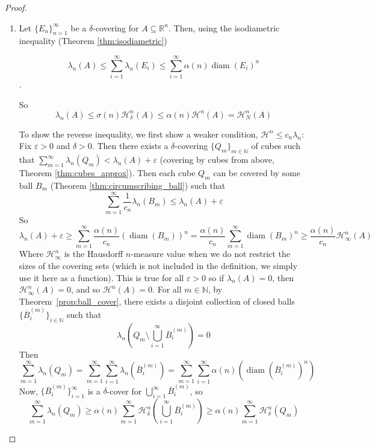 \documentclass{article}
\theoremstyle{plain}
\theoremstyle{definition}
\DeclareMathOperator{\diam}{diam}
\theoremstyle{remark}
\begin{document}
\begin{proof}
\begin{enumerate}
        \item Let $\{E_n\}_{n=1}^\infty$ be a $\delta$-covering for $A\subseteq \mathbb{R}^n$. Then, using the isodiametric inequality (Theorem \ref{thm:isodiametric})
        
            \[\lambda_n(A) \le \sum \limits _{i=1}^\infty \lambda_n(E_i) \le \sum \limits _{i=1}^\infty \alpha (n) \diam (E_i)^n\].
            
            So 
            \[\lambda_n(A) \le \sigma(n) \mathcal{H}^n_\delta (A) \le \alpha(n) \mathcal{H}^n(A) = \mathcal{H}_N^n(A)\] 
        
        To show the reverse inequality, we first show a weaker condition, $\mathcal{H}^n \le c_n \lambda_n$: Fix $\varepsilon>0$ and $\delta > 0$. Then there exists a $\delta$-covering $\{Q_m\}_{m\in \mathbb{N}}$ of cubes such that $\sum \limits _{m=1}^\infty \lambda_n(Q_m) < \lambda_n(A)+\varepsilon$ (covering by cubes from above, Theorem \ref{thm:cubes_approx}). Then each cube $Q_m$ can be covered by some ball $B_m$ (Theorem \ref{thm:circumscribing_ball}) such that 
        \[\sum \limits _{m=1}^\infty \frac{1}{c_n} \lambda_n(B_m) \le  \lambda_n(A)+\varepsilon\]
        So
        \[
        \lambda_n(A) + \varepsilon \ge \sum \limits _{m=1}^\infty \frac{\alpha (n)}{c_n} \left ({\diam (B_m)} \right )^n =\frac{\alpha (n)}{c_n} \sum \limits _{m=1}^\infty \diam (B_m)^n \ge \frac{\alpha (n)}{c_n} \mathcal{H}_\infty ^n(A)
        \]
        Where $\mathcal{H}_{\infty} ^n$ is the Hausdorff $n$-measure value when we do not restrict the sizes of the covering sets (which is not included in the definition, we simply use it here as a function). This is true for all $\varepsilon>0$ so if $\lambda_n(A)=0$, then $\mathcal{H}^n_\infty (A)=0$, and so $\mathcal{H}^n(A)=0$. For all $m \in \mathbb{N}$, by Theorem~\ref{prop:ball_cover}, there exists a disjoint collection of closed balls $\{\overline{B}_i^{(m)}\}_{i\in \mathbb{N}}$ such that 
        \[
        \lambda_n \left (Q_m  \setminus\bigcup \limits _{i=1}^\infty \overline{B}^{(m)}_i \right ) = 0
        \]
        Then 
        \[
        \sum \limits _{m=1}^\infty \lambda_n(Q_m) = \sum \limits _{m=1}^\infty \sum \limits _{i=1}^\infty \lambda_n(\overline{B}^{(m)}_i) = \sum \limits _{m=1}^\infty \sum \limits _{i=1}^ \infty \alpha (n)(\diam (\overline{B}_i ^{(m)})^n)
        \]
        Now, $\{\overline{B}_i^{(m)}\}_{i=1} ^\infty$ is a $\delta$-cover for $\bigcup \limits_{i=1}^\infty \overline{B}_i^{(m)}$, so
        \[
        \sum \limits _{m=1}^\infty \lambda_n(Q_m) \ge \alpha (n)\sum \limits _{m=1}^\infty \mathcal{H}^n_\delta \left(\bigcup \limits _{i=1}^\infty \overline{B}_i ^{(m)} \right)\ge  \alpha (n) \sum \limits _{m=1}^\infty \mathcal{H}^n_\delta (Q_m)
\]
\end{enumerate}
\end{proof}
\end{document}
